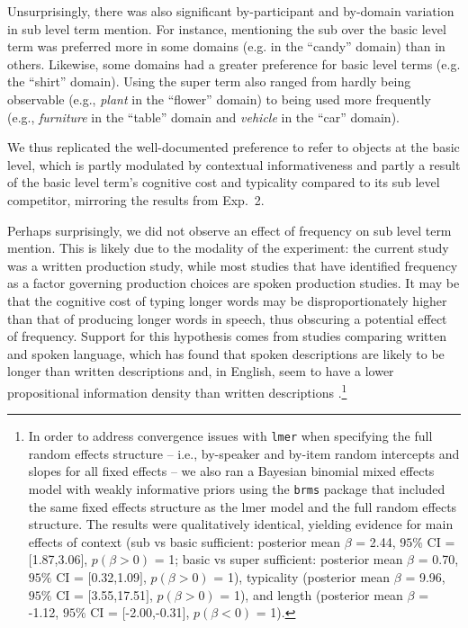 \documentclass[11pt]{article}
\newcommand{\figref}[1]{Figure \ref{#1}}
\begin{document}
Unsurprisingly, there was also significant by-participant and by-domain variation in sub level term mention. %
For instance, mentioning the sub over the basic level term was preferred more in some domains (e.g. in the ``candy'' domain) than in others. Likewise, some domains had a greater preference for basic level terms (e.g. the ``shirt'' domain). Using the super term also ranged from hardly being observable (e.g., \emph{plant} in the ``flower'' domain) to being used more frequently (e.g., \emph{furniture} in the ``table'' domain and \emph{vehicle} in the ``car'' domain). 

We thus replicated the well-documented preference to refer to objects at the basic level, which is partly modulated by contextual informativeness and partly a result of the basic level term's cognitive cost and typicality compared to its sub level competitor, mirroring the results from Exp.~2. 

Perhaps surprisingly, we did not observe an effect of frequency on sub level term mention. This is likely due to the modality of the experiment: the current study was a written production study, while most studies that have identified frequency as a factor governing production choices are spoken production studies. It may be that the cognitive cost of typing longer words may be disproportionately higher than that of producing longer words in speech, thus obscuring a potential effect of frequency. Support for this hypothesis comes from studies comparing written and spoken language, which has found that spoken descriptions are likely to be longer than written descriptions and, in English, seem to have a lower propositional information density than written descriptions \cite{VanMiltenburg2018}.\footnote{In order to address convergence issues with \verb+lmer+ when specifying the full random effects structure -- i.e., by-speaker and by-item random intercepts and slopes for all fixed effects -- we also ran a Bayesian binomial mixed effects model with weakly informative priors using the \verb+brms+ package \cite{brms} that included the same fixed effects structure as the lmer model and the full random effects structure. The results were qualitatively identical, yielding  evidence for main effects of context (sub vs basic sufficient: posterior mean $\beta$ = 2.44, $95\%$ CI = $[$1.87,3.06$]$, $p(\beta > 0)$ = 1; basic vs super sufficient: posterior mean $\beta$ = 0.70, $95\%$ CI = $[$0.32,1.09$]$, $p(\beta > 0)$ = 1), typicality (posterior mean $\beta$ = 9.96, $95\%$ CI = $[$3.55,17.51$]$, $p(\beta > 0)$ = 1), and length (posterior mean $\beta$ = -1.12, $95\%$ CI = $[$-2.00,-0.31$]$, $p(\beta < 0)$ = 1).} 
\end{document}
